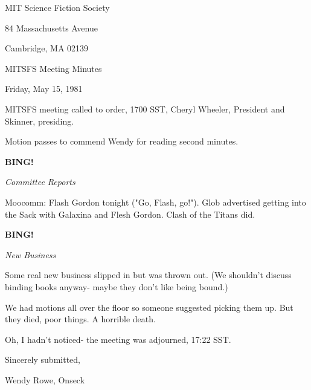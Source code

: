 \documentclass[12pt]{article}
\newcommand{\bing}{{\bf BING!} }
\newcommand{\goto}[1]{\bing \vskip 12pt \centerline{{\em{#1}}}}
\begin{document}
\begin{center}

MIT Science Fiction Society 

84 Massachusetts Avenue

Cambridge, MA 02139

\vspace{12pt}

MITSFS Meeting Minutes 

Friday, May 15, 1981

\end{center}
 
\vspace{18pt}

\setlength{\parskip}{6pt}

\noindent
MITSFS meeting called to order, 1700 SST,
Cheryl Wheeler, President and Skinner, presiding.

Motion passes to commend Wendy for reading second minutes.

\goto{Committee Reports}

Moocomm: Flash Gordon tonight ("Go, Flash, go!"). Glob advertised getting into the Sack with Galaxina and Flesh Gordon. Clash of the Titans did.

\goto{New Business}

Some real new business slipped in but was thrown out. (We shouldn't discuss binding books anyway- maybe they don't like being bound.)

We had motions all over the floor so someone suggested picking them up. But they died, poor things. A horrible death.

\vspace{12pt}

\noindent
Oh, I hadn't noticed- the meeting was adjourned, 17:22 SST.

\vspace{18pt}

\centerline{Sincerely submitted,}
\centerline{Wendy Rowe, Onseck}
\end{document}
